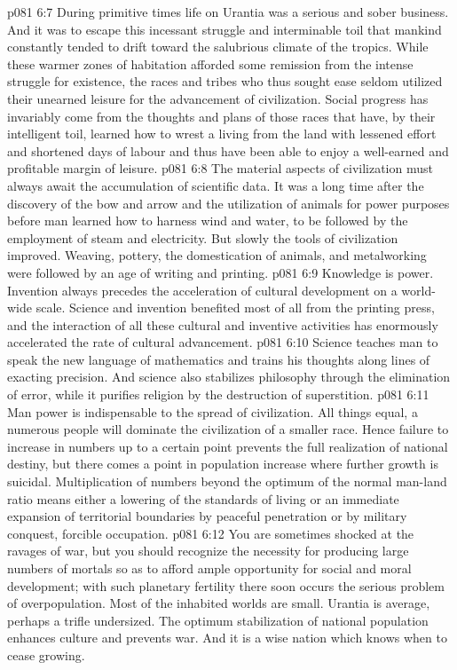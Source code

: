 \vs p081 6:7 During primitive times life on Urantia was a serious and sober business. And it was to escape this incessant struggle and interminable toil that mankind constantly tended to drift toward the salubrious climate of the tropics. While these warmer zones of habitation afforded some remission from the intense struggle for existence, the races and tribes who thus sought ease seldom utilized their unearned leisure for the advancement of civilization. Social progress has invariably come from the thoughts and plans of those races that have, by their intelligent toil, learned how to wrest a living from the land with lessened effort and shortened days of labour and thus have been able to enjoy a well\hyp{}earned and profitable margin of leisure.
\vs p081 6:8 \bibnobreakspace {} The material aspects of civilization must always await the accumulation of scientific data. It was a long time after the discovery of the bow and arrow and the utilization of animals for power purposes before man learned how to harness wind and water, to be followed by the employment of steam and electricity. But slowly the tools of civilization improved. Weaving, pottery, the domestication of animals, and metalworking were followed by an age of writing and printing.
\vs p081 6:9 Knowledge is power. Invention always precedes the acceleration of cultural development on a world\hyp{}wide scale. Science and invention benefited most of all from the printing press, and the interaction of all these cultural and inventive activities has enormously accelerated the rate of cultural advancement.
\vs p081 6:10 Science teaches man to speak the new language of mathematics and trains his thoughts along lines of exacting precision. And science also stabilizes philosophy through the elimination of error, while it purifies religion by the destruction of superstition.
\vs p081 6:11 \bibnobreakspace {} Man power is indispensable to the spread of civilization. All things equal, a numerous people will dominate the civilization of a smaller race. Hence failure to increase in numbers up to a certain point prevents the full realization of national destiny, but there comes a point in population increase where further growth is suicidal. Multiplication of numbers beyond the optimum of the normal man\hyp{}land ratio means either a lowering of the standards of living or an immediate expansion of territorial boundaries by peaceful penetration or by military conquest, forcible occupation.
\vs p081 6:12 You are sometimes shocked at the ravages of war, but you should recognize the necessity for producing large numbers of mortals so as to afford ample opportunity for social and moral development; with such planetary fertility there soon occurs the serious problem of overpopulation. Most of the inhabited worlds are small. Urantia is average, perhaps a trifle undersized. The optimum stabilization of national population enhances culture and prevents war. And it is a wise nation which knows when to cease growing.
